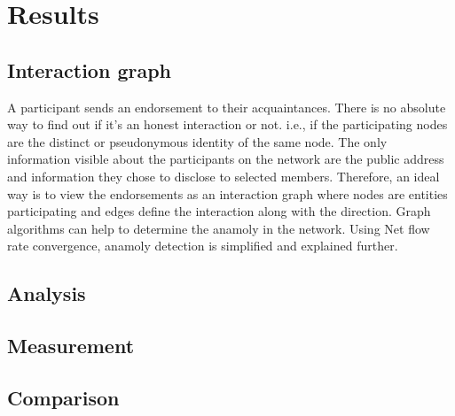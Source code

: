 \chapter{Results} \label{ch:results}


\section{Interaction graph}
A participant sends an endorsement to their acquaintances. There is no absolute
way to find out if it's an honest interaction or not. i.e., if the
participating nodes are the distinct or pseudonymous identity of the same node.
The only information visible about the participants on the network are the
public address and information they chose to disclose to selected members.
Therefore, an ideal way is to view the endorsements as an interaction graph
where nodes are entities participating and edges define the interaction along
with the direction. Graph algorithms can help to determine the anamoly in the
network. Using Net flow rate convergence, anamoly detection is simplified and
explained further. 


\section{Analysis}
\section{Measurement}
\section{Comparison}

